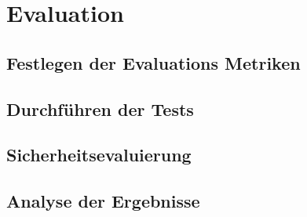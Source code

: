 \chapter{Evaluation}
\label{cha:evaluation}

\section{Festlegen der Evaluations Metriken}
\blindtext

\section{Durchführen der Tests}
\blindtext

\section{Sicherheitsevaluierung}
\blindtext

\section{Analyse der Ergebnisse}
\blindtext
